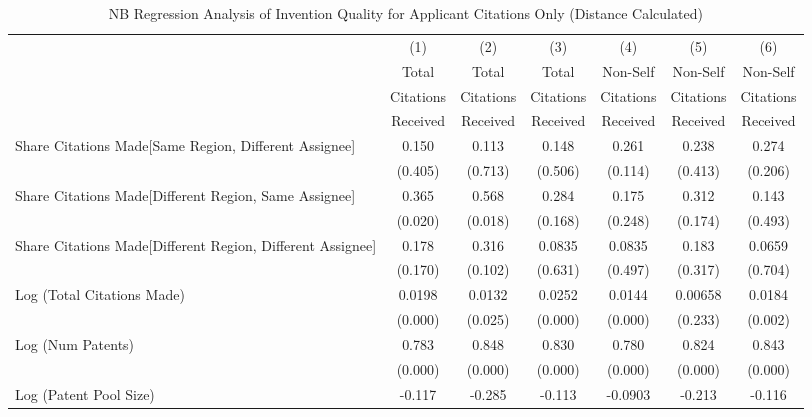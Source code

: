 \begin{table}[htbp]\centering
\caption{NB Regression Analysis of Invention Quality for Applicant Citations Only (Distance Calculated) \label{a.model123192021}}
\scriptsize
\singlespacing
\begin{tabular}{l*{6}{c}}
\hline\hline
                &\multicolumn{1}{c}{(1)}&\multicolumn{1}{c}{(2)}&\multicolumn{1}{c}{(3)}&\multicolumn{1}{c}{(4)}&\multicolumn{1}{c}{(5)}&\multicolumn{1}{c}{(6)}\\
                &\multicolumn{1}{c}{Total}&\multicolumn{1}{c}{Total}&\multicolumn{1}{c}{Total}&\multicolumn{1}{c}{Non-Self}&\multicolumn{1}{c}{Non-Self}&\multicolumn{1}{c}{Non-Self}\\
                &\multicolumn{1}{c}{Citations}&\multicolumn{1}{c}{Citations}&\multicolumn{1}{c}{Citations}&\multicolumn{1}{c}{Citations}&\multicolumn{1}{c}{Citations}&\multicolumn{1}{c}{Citations}\\
                 &\multicolumn{1}{c}{Received}&\multicolumn{1}{c}{Received}&\multicolumn{1}{c}{Received}&\multicolumn{1}{c}{Received}&\multicolumn{1}{c}{Received}&\multicolumn{1}{c}{Received}\\
\hline
Share Citations Made[Same Region, Different Assignee]&    0.150&    0.113&    0.148&    0.261&    0.238&    0.274\\
                &  (0.405)&  (0.713)&  (0.506)&  (0.114)&  (0.413)&  (0.206)\\
Share Citations Made[Different Region, Same Assignee]&    0.365&    0.568&    0.284&    0.175&    0.312&    0.143\\
                &  (0.020)&  (0.018)&  (0.168)&  (0.248)&  (0.174)&  (0.493)\\
Share Citations Made[Different Region, Different Assignee]&    0.178&    0.316&   0.0835&   0.0835&    0.183&   0.0659\\
                &  (0.170)&  (0.102)&  (0.631)&  (0.497)&  (0.317)&  (0.704)\\
Log (Total Citations Made)&   0.0198&   0.0132&   0.0252&   0.0144&  0.00658&   0.0184\\
                &  (0.000)&  (0.025)&  (0.000)&  (0.000)&  (0.233)&  (0.002)\\
Log (Num Patents)&    0.783&    0.848&    0.830&    0.780&    0.824&    0.843\\
                &  (0.000)&  (0.000)&  (0.000)&  (0.000)&  (0.000)&  (0.000)\\
Log (Patent Pool Size)&   -0.117&   -0.285&   -0.113&  -0.0903&   -0.213&   -0.116\\

\end{tabular}
\end{table}
